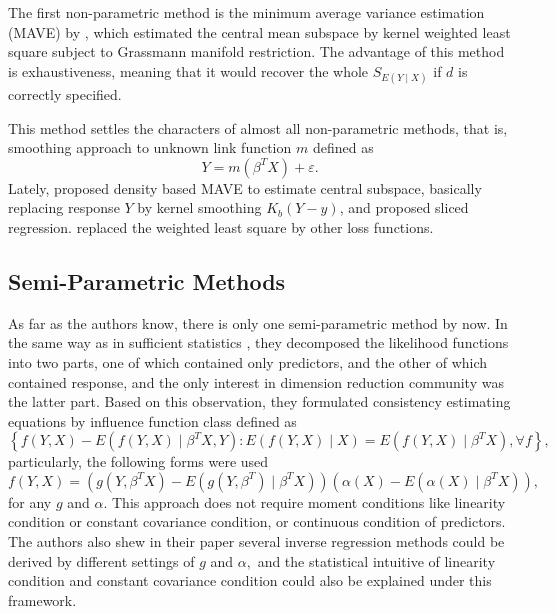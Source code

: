 The first non-parametric method is the minimum average variance estimation
(MAVE) by \citet{xia2002adaptive}, which estimated the central mean
subspace by kernel weighted least square subject to Grassmann manifold
restriction. The advantage of this method is exhaustiveness, meaning
that it would recover the whole $S_{E\left(Y\mid X\right)}$ if $d$
is correctly specified. %
\begin{comment}
add bayesian method khare
\end{comment}
This method settles the characters of almost all non-parametric methods,
that is, smoothing approach to unknown link function $m$ defined
as 
\[
Y=m\left(\beta^{T}X\right)+\varepsilon.
\]
Lately, \citet{xia2007constructive} proposed density based MAVE to
estimate central subspace, basically replacing response $Y$ by kernel
smoothing $K_{b}\left(Y-y\right)$, and \citet{wang2008sliced} proposed
sliced regression. \citet{hernandez2005dimension,yin2005direction,yin2008successive}
replaced the weighted least square by other loss functions.


\subsection{Semi-Parametric Methods}

As far as the authors know, there is only one semi-parametric method
by \citet{ma2012semiparametric} now. In the same way as in sufficient
statistics , they decomposed the likelihood functions into two parts,
one of which contained only predictors, and the other of which contained
response, and the only interest in dimension reduction community was
the latter part. Based on this observation, they formulated consistency
estimating equations by influence function class defined as 
\[
\left\{ f\left(Y,X\right)-E\left(f\left(Y,X\right)\mid\beta^{T}X,Y\right):E\left(f\left(Y,X\right)\mid X\right)=E\left(f\left(Y,X\right)\mid\beta^{T}X\right),\forall f\right\} ,
\]
particularly, the following forms were used 
\[
f\left(Y,X\right)=\left(g\left(Y,\beta^{T}X\right)-E\left(g\left(Y,\beta^{T}\right)\mid\beta^{T}X\right)\right)\left(\alpha\left(X\right)-E\left(\alpha\left(X\right)\mid\beta^{T}X\right)\right),
\]
for any $g$ and $\alpha$. This approach does not require moment
conditions like linearity condition or constant covariance condition,
or continuous condition of predictors. The authors also shew in their
paper several inverse regression methods could be derived by different
settings of $g$ and $\alpha,$ and the statistical intuitive of linearity
condition and constant covariance condition could also be explained
under this framework.


